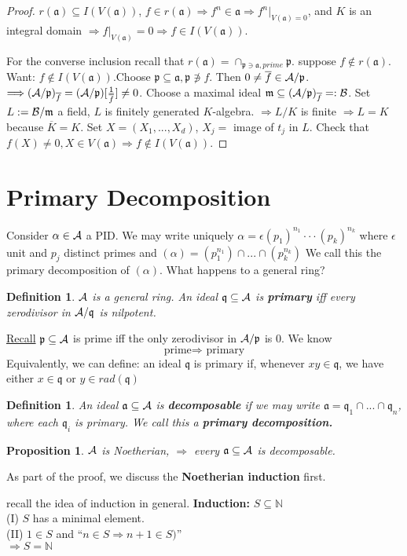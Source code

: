 \documentclass[11pt]{article}
\newtheorem{prop}[thm]{Proposition}
\newtheorem{dfn}[thm]{Definition}
\newcommand{\sca}{{\mathfrak a}}
\newcommand{\scm}{{\mathfrak m}}
\newcommand{\scp}{{\mathfrak p}}
\newcommand{\scq}{\mathfrak q}
\newcommand{\cala}{{\cal A}}
\newcommand{\calb}{{\cal B}}
\newcommand{\Lrta}{\Longrightarrow}
\begin{document}
\begin{proof}
$r(\sca)\subseteq I(V(\sca))$, $f\in r(\sca)\Lrta f^n\in \sca\Lrta f^n|_{V(\sca)=0}$, and $K$ is an integral domain $\Lrta f|_{V(\sca)}=0$$\Lrta f\in I(V(\sca))$. 

For the converse inclusion recall that $r(\sca)=\cap_{\scp\ni \sca, prime}\scp$. suppose $f\notin  r(\sca) $. Want: $f\notin I(V(\sca))$.Choose $\scp\subseteq \sca,\scp \not \ni f$. Then $0\neq \overline{f}\in \cala/\scp$. $\Lrta (\cala/\scp)_{\overline{f}}=(\cala/\scp)[\frac{1}{\overline{f}}]\neq 0$. Choose a maximal ideal $\scm\subseteq (\cala/\scp)_{\overline{f}}=:\calb$. Set $L:=\calb/\scm$ a field, $L$ is finitely generated $K$-algebra. $\Lrta L/K $ is finite $\Lrta L=K$ because $\overline{K}=K$. Set $X=(X_1,...,X_d)$, $X_j=$ image of $t_j$ in $L$. Check that $f(X)\neq 0,X\in V(\sca)\Lrta f\notin I(V(\sca))$.
\end{proof}

\section{Primary Decomposition}
Consider $\alpha\in \cala$ a PID. We may write uniquely $\alpha=\epsilon (p_1)^{n_1}\cdot \cdot\cdot (p_k)^{n_k}$ where $\epsilon$ unit and $p_j$ distinct  primes and $(\alpha)=(p_1^{n_1})\cap...\cap(p_k^{n_k})$ We call this the primary decomposition of $(\alpha)$. What happens to a general ring?


\begin{dfn}$\cala$ is a general ring. 
An ideal $\scq\subseteq\cala$ is \textbf{primary} iff every zerodivisor in $\cala/\scq$ is nilpotent.
\end{dfn}
\underline{Recall} $\scp\subseteq\cala$ is prime iff the only zerodivisor in $\cala/\scp$ is $0$. We know
$$
\text{prime}\Lrta\text{ primary}
$$
Equivalently, we can define: an ideal $\scq$ is primary if, whenever $xy\in\scq$, we have either $x\in\scq$ or $y\in rad(\scq)$
\begin{dfn}
An ideal $\sca\subseteq \cala$ is \textbf{decomposable} if we may write $\sca=\scq_1\cap...\cap \scq_n$, where each $\scq_i$ is primary. We call this a \textbf{primary decomposition.}
\end{dfn}
\begin{prop}
$\cala$ is Noetherian, $\Lrta$ every $\sca\subseteq \cala$ is decomposable. 
\end{prop}
As part of the proof, we discuss the \textbf{Noetherian induction} first.

recall the idea of induction in general.
\textbf{Induction:} $S\subseteq \mathbb{N}$\\
(I) $S$ has a minimal element.\\
(II) $1\in S$ and ``$n\in S\Lrta n+1\in S)$''\\
 $\Lrta S=\mathbb{N}$
\end{document}
